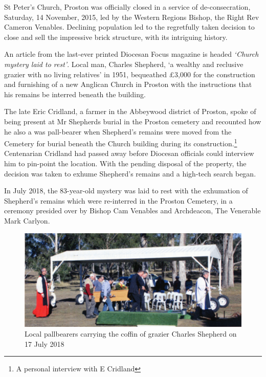 St Peter's Church, Proston was officially closed in a service of de-consecration, Saturday, 14 November, 2015, led by the Western Regions Bishop, the Right Rev Cameron Venables. Declining population led to the regretfully taken decision to close and sell the impressive brick structure, with its intriguing history.



An article from the last-ever printed Diocesan Focus magazine is headed \emph{`Church mystery laid to rest'}. Local man, Charles Shepherd, `a wealthy and reclusive grazier with no living relatives' in 1951, bequeathed \pounds3,000 for the construction and furnishing of a new Anglican Church in Proston with the instructions that his remains be interred beneath the building.



The late Eric Cridland, a farmer in the Abbeywood district of Proston, spoke of being present at Mr Shepherds burial in the Proston cemetery and recounted how he also a was pall-bearer when Shepherd's remains were moved from the Cemetery for burial beneath the Church building during its construction.\footnote{A personal interview with E Cridland} Centenarian Cridland had passed away before Diocesan officials could interview him to pin-point the location. With the pending disposal of the property, the decision was taken to exhume Shepherd's remains and a high-tech search began.


In July 2018, the 83-year-old mystery was laid to rest with the exhumation of Shepherd's remains which were re-interred in the Proston Cemetery, in a ceremony presided over by Bishop Cam Venables and Archdeacon, The Venerable Mark Carlyon.









\begin{figure}[!htb]
\begin{center}
\includegraphics[width=1.\textwidth,center]{../images/charlesShepherd.jpg}
\caption{Local pallbearers carrying the coffin of grazier Charles Shepherd on 17 July 2018}
\end{center}
\end{figure}





